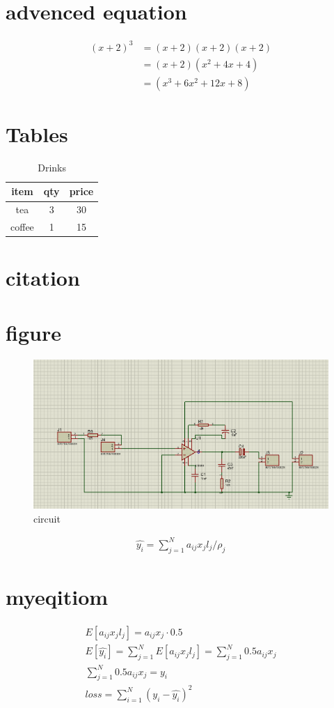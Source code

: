 \documentclass[twocolumn]{article}
\begin{document}
\section{advenced equation}
\begin{align*}
	(x+2)^3&=(x+2)(x+2)(x+2)\\
	&=(x+2)(x^2+4x+4)\\
	&=(x^3+6x^2+12x+8)
\end{align*}
	
\section{Tables}
\begin{table}[b]
	\centering
	\caption{Drinks}
	\label{tab:Drinks}
	\begin{tabular}{|c|c|c|}
		\hline
		item&qty&price\\
		\hline
		tea&3&30\\
		\hline %
		coffee&1&15\\
		\hline
	\end{tabular}
\end{table}

\section{citation}
	

\section{figure}
\begin{figure}
	\includegraphics[width=0.9\columnwidth]{ampilifier}
	\caption{circuit}
\end{figure}
\begin{multline}
	\hat{y_{i}}=\sum_{j=1}^{N}a_{ij}x_{j}l_{j}/\rho_{j}
\end{multline}
\section{myeqitiom}
\begin{align}
E[a_{ij}x_{j}l_{j}] = a_{ij}x_{j}\cdot 0.5\\
E[\hat{y_{i}}] = \sum_{j=1}^{N}E[a_{ij}x_{j}l_{j}] = \sum_{j=1}^{N}0.5a_{ij}x_{j}\\
\sum_{j=1}^{N}0.5a_{ij}x_{j} = y_{i}\\
loss = \sum_{i=1}^{N}(y_{i} - \hat{y_{i}})^2
\end{align}
\end{document}

